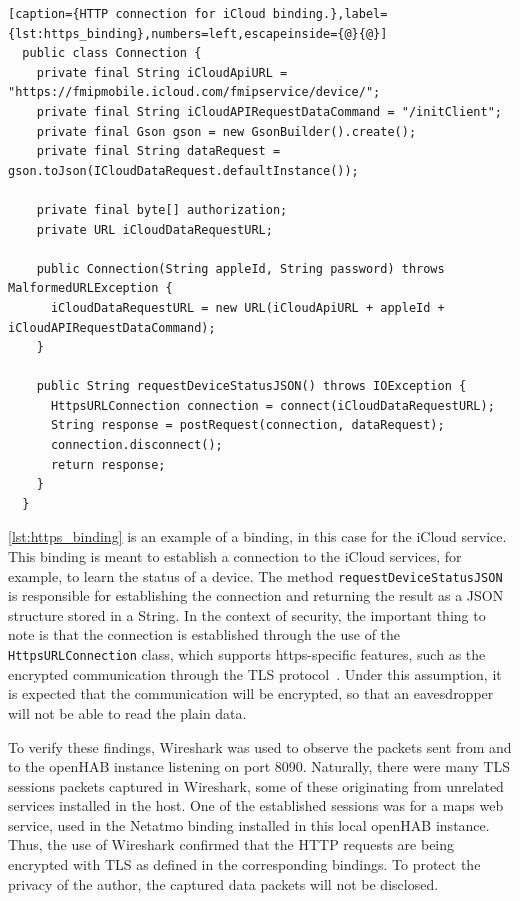 \documentclass[12pt]{article}
\begin{document}
\newpage
\begin{lstlisting}[caption={HTTP connection for iCloud binding.},label={lst:https_binding},numbers=left,escapeinside={@}{@}]
  public class Connection {
    private final String iCloudApiURL = "https://fmipmobile.icloud.com/fmipservice/device/";
    private final String iCloudAPIRequestDataCommand = "/initClient";
    private final Gson gson = new GsonBuilder().create();
    private final String dataRequest = gson.toJson(ICloudDataRequest.defaultInstance());
    
    private final byte[] authorization;
    private URL iCloudDataRequestURL;
    
    public Connection(String appleId, String password) throws MalformedURLException {
      iCloudDataRequestURL = new URL(iCloudApiURL + appleId + iCloudAPIRequestDataCommand);
    } 
    
    public String requestDeviceStatusJSON() throws IOException {
      HttpsURLConnection connection = connect(iCloudDataRequestURL);
      String response = postRequest(connection, dataRequest);
      connection.disconnect();    
      return response;
    }
  }
\end{lstlisting}

\autoref{lst:https_binding} is an example of a binding, in this case for the iCloud service. This binding is meant to establish a connection to the iCloud services, for example, to learn the status of a device. The method \texttt{requestDeviceStatusJSON} is responsible for establishing the connection and returning the result as a JSON structure stored in a String. In the context of security, the important thing to note is that the connection is established through the use of the \texttt{HttpsURLConnection} class, which supports https-specific features, such as the encrypted communication through the TLS protocol~\cite{java_01}. Under this assumption, it is expected that the communication will be encrypted, so that an eavesdropper will not be able to read the plain data.

To verify these findings, Wireshark was used to observe the packets sent from and to the openHAB instance listening on port 8090. Naturally, there were many TLS sessions packets captured in Wireshark, some of these originating from unrelated services installed in the host. One of the established sessions was for a maps web service, used in the Netatmo binding installed in this local openHAB instance. Thus, the use of Wireshark confirmed that the HTTP requests are being encrypted with TLS as defined in the corresponding bindings. To protect the privacy of the author, the captured data packets will not be disclosed. 
\end{document}
